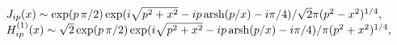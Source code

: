 \begin{equation}\label{Besselp>x}\begin{array}{l}J_{ip}(x)\sim\exp(p\,\pi/2)\exp(i\sqrt{p^2+x^2}-ip\,$arsh$(p/x)-i\pi/4)/\sqrt{2}\pi(p^2-x^2)^{1/4},\\
H^{(1)}_{ip}(x)\sim\sqrt{2}\exp(p\,\pi/2)\exp(i\sqrt{p^2+x^2}-ip\,$arsh$(p/x)-i\pi/4)/\pi(p^2+x^2)^{1/4},\end{array}\end{equation}


